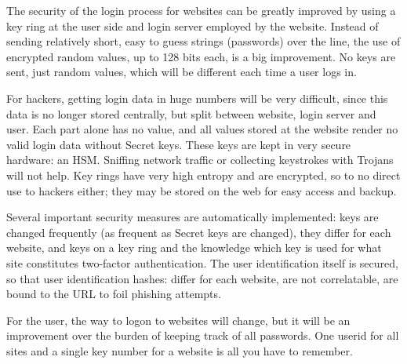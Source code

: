 The security of the login process for websites can be greatly improved by using a key ring at the user side and login server employed by the website.
Instead of sending relatively short,
easy to guess strings
(passwords)
over the line,
the use of encrypted random values,
up to 128 bits each,
is a big improvement.
No keys are sent,
just random values,
which will be different each time a user logs in.
\par
For hackers,
getting login data in huge numbers will be very difficult,
since this data is no longer stored centrally,
but split between website,
login server and user.
Each part alone has no value,
and all values stored at the website render no valid login data without Secret keys.
These keys are kept in very secure hardware: an HSM.
Sniffing network traffic or collecting keystrokes with Trojans will not help.
Key rings have very high entropy and are encrypted,
so to no direct use to hackers either;
they may be stored on the web for easy access and backup.
\par
Several important security measures are automatically implemented:
keys are changed frequently
(as frequent as Secret keys are changed),
they differ for each website,
and keys on a key ring and the knowledge which key is used for what site constitutes two-factor authentication.
The user identification itself is secured,
so that user identification hashes:
differ for each website,
are not correlatable,
are bound to the URL to foil phishing attempts.
\par
For the user,
the way to logon to websites will change,
but it will be an improvement over the burden of keeping track of all passwords.
One userid for all sites and a single key number for a website is all you have to remember.

